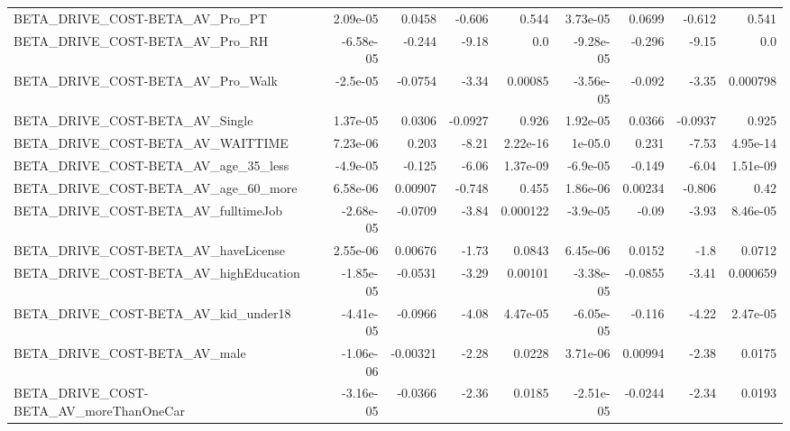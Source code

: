 \begin{tabular}{lrrrrrrrr}
BETA\_DRIVE\_COST-BETA\_AV\_Pro\_PT                     &    2.09e-05 &       0.0458 &   -0.606 &    0.544 &   3.73e-05 &      0.0699 &       -0.612 &         0.541 \\
BETA\_DRIVE\_COST-BETA\_AV\_Pro\_RH                     &   -6.58e-05 &       -0.244 &    -9.18 &      0.0 &  -9.28e-05 &      -0.296 &        -9.15 &           0.0 \\
BETA\_DRIVE\_COST-BETA\_AV\_Pro\_Walk                   &    -2.5e-05 &      -0.0754 &    -3.34 &  0.00085 &  -3.56e-05 &      -0.092 &        -3.35 &      0.000798 \\
BETA\_DRIVE\_COST-BETA\_AV\_Single                     &    1.37e-05 &       0.0306 &  -0.0927 &    0.926 &   1.92e-05 &      0.0366 &      -0.0937 &         0.925 \\
BETA\_DRIVE\_COST-BETA\_AV\_WAITTIME                   &    7.23e-06 &        0.203 &    -8.21 & 2.22e-16 &    1e-05.0 &       0.231 &        -7.53 &      4.95e-14 \\
BETA\_DRIVE\_COST-BETA\_AV\_age\_35\_less                &    -4.9e-05 &       -0.125 &    -6.06 & 1.37e-09 &   -6.9e-05 &      -0.149 &        -6.04 &      1.51e-09 \\
BETA\_DRIVE\_COST-BETA\_AV\_age\_60\_more                &    6.58e-06 &      0.00907 &   -0.748 &    0.455 &   1.86e-06 &     0.00234 &       -0.806 &          0.42 \\
BETA\_DRIVE\_COST-BETA\_AV\_fulltimeJob                &   -2.68e-05 &      -0.0709 &    -3.84 & 0.000122 &   -3.9e-05 &       -0.09 &        -3.93 &      8.46e-05 \\
BETA\_DRIVE\_COST-BETA\_AV\_haveLicense                &    2.55e-06 &      0.00676 &    -1.73 &   0.0843 &   6.45e-06 &      0.0152 &         -1.8 &        0.0712 \\
BETA\_DRIVE\_COST-BETA\_AV\_highEducation              &   -1.85e-05 &      -0.0531 &    -3.29 &  0.00101 &  -3.38e-05 &     -0.0855 &        -3.41 &      0.000659 \\
BETA\_DRIVE\_COST-BETA\_AV\_kid\_under18                &   -4.41e-05 &      -0.0966 &    -4.08 & 4.47e-05 &  -6.05e-05 &      -0.116 &        -4.22 &      2.47e-05 \\
BETA\_DRIVE\_COST-BETA\_AV\_male                       &   -1.06e-06 &     -0.00321 &    -2.28 &   0.0228 &   3.71e-06 &     0.00994 &        -2.38 &        0.0175 \\
BETA\_DRIVE\_COST-BETA\_AV\_moreThanOneCar             &   -3.16e-05 &      -0.0366 &    -2.36 &   0.0185 &  -2.51e-05 &     -0.0244 &        -2.34 &        0.0193 \\

\end{tabular}
